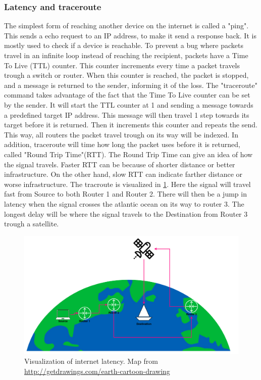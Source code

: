 \subsubsection{Latency and traceroute}
The simplest form of reaching another device on the internet is called a "ping". This sends a echo request to an IP address, to make it send a response back. It is mostly used to check if a device is reachable. To prevent a bug where packets travel in an infinite loop instead of reaching the recipient, packets have a Time To Live (TTL) counter. This counter increments every time a packet travels trough a switch or router. When this counter is reached, the packet is stopped, and a message is returned to the sender, informing it of the loss.
The "traceroute" command takes advantage of the fact that the Time To Live counter can be set by the sender. It will start the TTL counter at 1 and sending a message towards a predefined target IP address. This message will then travel 1 step towards its target before it is returned. Then it increments this counter and repeats the send. This way, all routers the packet travel trough on its way will be indexed. In addition, traceroute will time how long the packet uses before it is returned, called "Round Trip Time"(RTT).
The Round Trip Time can give an idea of how the signal travels. Faster RTT can be because of shorter distance or better infrastructure. On the other hand, slow RTT can indicate farther distance or worse infrastructure.
The tracroute is visualized in \cref{fig:latency}. Here the signal will travel fast from Source to both Router 1 and Router 2. There will then be a jump in latency when the signal crosses the atlantic ocean on its way to router 3. The longest delay will be where the signal travels to the Destination from Router 3 trough a satellite.

\begin{figure} [H]
    \centering
    \includegraphics[scale=0.3]{Figurer/latency.png}
    \caption{Visualization of internet latency. Map from \href{http://getdrawings.com/earth-cartoon-drawing}{http://getdrawings.com/earth-cartoon-drawing}}
    \label{fig:latency}
\end{figure}


